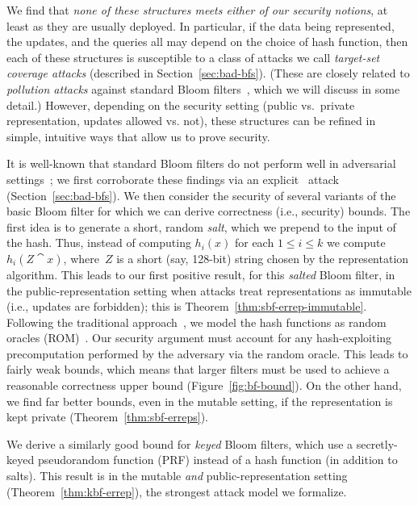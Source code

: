 We find
that \emph{none of these structures meets either of our security notions}, at least as
they are usually deployed. In particular, if the data being represented,
the updates, and the queries all may depend on the choice of hash function, then each of
these structures is susceptible to a class of attacks we call \emph{target-set
coverage attacks} (described in Section~\ref{sec:bad-bfs}). (These are closely
related to \emph{pollution attacks} against standard Bloom
filters~\cite{gerbet2015power}, which we will discuss in some detail.)
%
However, depending on the security setting (public vs.\ private
representation, updates allowed vs. not), these structures can be refined in
simple, intuitive ways that allow us to prove security.

%
It is well-known that standard Bloom filters do not perform well in adversarial
settings~\cite{naor2015bloom,gerbet2015power}; we first corroborate these
findings via an explicit \erreps\ attack (Section~\ref{sec:bad-bfs}).
%
We then consider the security of several variants of the basic Bloom
filter for which we can derive correctness (i.e., security) bounds.
%
The first idea is to generate a short, random \emph{salt}, which we prepend to
the input of the hash. Thus, instead of computing $h_i(x)$ for each $1\leq i
\leq k$ we compute $h_i(Z \cat x)$, where~$Z$ is a short (say, 128-bit) string
chosen by the representation algorithm.
%
This leads to our first positive result, for this \emph{salted} Bloom filter, in the
public-representation setting when attacks treat representations as
immutable (i.e., updates are forbidden); this is Theorem~\ref{thm:sbf-errep-immutable}.
%
Following the traditional approach~\cite{broder2004network}, we model the hash functions as random oracles
(ROM)~\cite{BR93}.  Our security argument must account for any hash-exploiting
precomputation performed by the adversary via the random oracle. This leads to
fairly weak bounds, which means that larger filters must be used to achieve a
reasonable correctness upper bound (Figure~\ref{fig:bf-bound}). 
%
On the other
hand, we find far better bounds, even in the mutable setting, if the
representation is kept private (Theorem~\ref{thm:sbf-erreps}). 

We derive a similarly good bound for \emph{keyed} Bloom filters, which use a
secretly-keyed pseudorandom function (PRF) instead of a hash function
(in addition to salts). This result is in the mutable \emph{and}
public-representation setting (Theorem~\ref{thm:kbf-errep}), the
strongest attack model we formalize.

